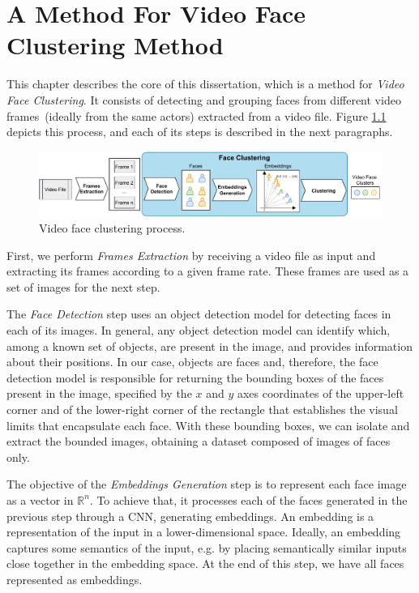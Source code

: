 \chapter{A Method For Video Face Clustering Method}
\label{chap:video_face_clustering}

This chapter describes the core of this dissertation, which is a method for \emph{Video Face Clustering}.
It consists of detecting and grouping faces from different video frames~(ideally from the same actors) extracted from a video file.
Figure \ref{fig:video_face_clustering} depicts this process, and each of its steps is described in the next paragraphs.

\begin{figure}[!ht]
    \centering
    \includegraphics[width=\textwidth]{img/face_clustering/video_face_clustering.pdf}
    \caption{Video face clustering process.}
    \label{fig:video_face_clustering}
\end{figure}


First, we perform \textit{Frames Extraction} by receiving a video file as input and extracting its frames according to a given frame rate. 
These frames are used as a set of images for the next step.

The \textit{Face Detection} step uses an object detection model for detecting faces in each of its images.
In general, any object detection model can identify which, among a known set of objects, are present in the image, and provides information about their positions.
In our case, objects are faces and, therefore, the face detection model is responsible for returning the bounding boxes of the faces present in the image, specified by the $x$ and $y$ axes coordinates of the upper-left corner and of the lower-right corner of the rectangle that establishes the visual limits that encapsulate each face. 
With these bounding boxes, we can isolate and extract the bounded images, obtaining a dataset composed of images of faces only.


The objective of the \textit{Embeddings Generation} step is to represent each face image as a vector in $\mathbb{R}^{n}$.
To achieve that, it processes each of the faces generated in the previous step through a CNN, generating embeddings. 
An embedding is a representation of the input in a lower-dimensional space.
Ideally, an embedding captures some semantics of the input, e.g. by placing semantically similar inputs close together in the embedding space.
At the end of this step, we have all faces represented as embeddings.

